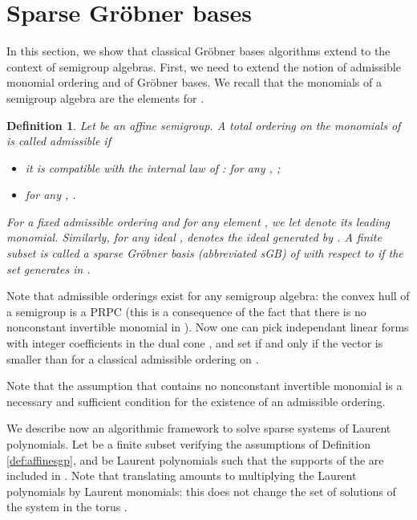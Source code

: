 \documentclass[12pt]{article}
\numberwithin{equation}{section}
\numberwithin{theorem}{section}
\newtheorem{definition}[theorem]{Definition}
\begin{document}
\section{Sparse Gr\"obner bases}\label{sec:sGB}
In this section, we show that classical Gr\"obner bases algorithms
extend to the context of semigroup algebras.  First, we need to extend
the notion of admissible monomial ordering and of Gr\"obner bases.  We
recall that the monomials of a semigroup algebra  are the
elements  for .

\begin{definition}\label{def:sGB}
Let  be an affine semigroup. A total ordering on the monomials of  is called \emph{admissible} if 
\begin{itemize}
\item it is compatible with the internal law of : for any , ;
\item for any , .
\end{itemize}
For a fixed admissible ordering  and for any element , we let  denote its leading monomial. Similarly, for any ideal ,  denotes the ideal generated by . A finite subset  is called a \emph{sparse Gr\"obner basis} (abbreviated sGB) of  with respect to  if the set  generates  in .
\end{definition}
Note that admissible orderings exist for any semigroup algebra: the
convex hull of a semigroup  is a PRPC 
(this is a consequence of the fact that there is no nonconstant invertible monomial
 in ).  Now one can pick  independant
linear forms  with integer coefficients in the
dual cone , and set  if
and only if the vector  is smaller
than  for a classical admissible
ordering on .

Note that the assumption that  contains no nonconstant invertible monomial is
a necessary and sufficient condition for the existence of an admissible ordering.

\smallskip

We describe now an algorithmic framework to solve sparse systems of Laurent polynomials.
Let  be a finite subset verifying the assumptions of Definition \ref{def:affinesgp}, and  be Laurent polynomials such that the supports of the  are included in . 
Note that translating  amounts to multiplying the Laurent polynomials by Laurent monomials: this does not change the set of solutions of the system in the torus .
\end{document}
